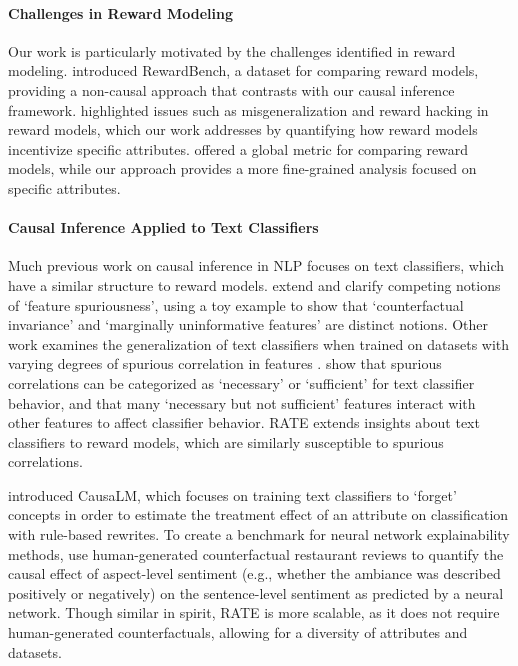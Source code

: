\documentclass{article}
\begin{document}
\paragraph{Challenges in Reward Modeling} Our work is particularly motivated by the challenges identified in reward modeling. \citet{lambert2024rewardbenchevaluatingrewardmodels} introduced RewardBench, a dataset for comparing reward models, providing a non-causal approach that contrasts with our causal inference framework. \citet{casper2023openproblemsfundamentallimitations} highlighted issues such as misgeneralization and reward hacking in reward models, which our work addresses by quantifying how reward models incentivize specific attributes. \citet{gleave2021quantifyingdifferencesrewardfunctions} offered a global metric for comparing reward models, while our approach provides a more fine-grained analysis focused on specific attributes.

\paragraph{Causal Inference Applied to Text Classifiers} Much previous work on causal inference in NLP focuses on text classifiers, which have a similar structure to reward models.
\citet{eisenstein2022informativenessinvarianceperspectivesspurious} extend and clarify competing notions of `feature spuriousness', using a toy example to show that `counterfactual invariance' and `marginally uninformative features' are distinct notions. Other work examines the generalization of text classifiers when trained on datasets with varying degrees of spurious correlation in features \citep{kaushik2020learningdifferencemakesdifference}. \citet{joshi-etal-2022-spurious} show that spurious correlations can be categorized as `necessary' or `sufficient' for text classifier behavior, and that many `necessary but not sufficient' features interact with other features to affect classifier behavior. RATE extends insights about text classifiers to reward models, which are similarly susceptible to spurious correlations.

\citet{Feder_2021} introduced CausaLM, which focuses on training text classifiers to `forget' concepts in order to estimate the treatment effect of an attribute on classification with rule-based rewrites. To create a benchmark for neural network explainability methods, \citet{abraham2022cebab} use human-generated counterfactual restaurant reviews to quantify the causal effect of aspect-level sentiment (e.g., whether the ambiance was described positively or negatively) on the sentence-level sentiment as predicted by a neural network. Though similar in spirit, RATE is more scalable, as it does not require human-generated counterfactuals, allowing for a diversity of attributes and datasets.
\end{document}
